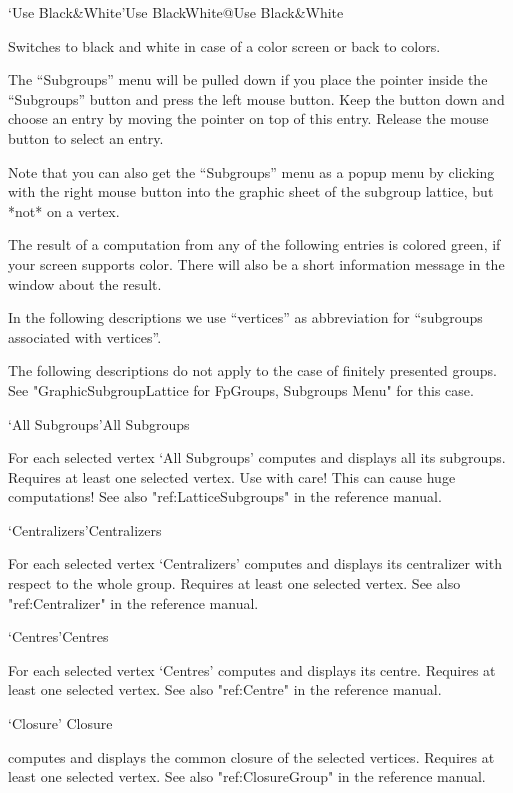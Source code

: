 \>`Use Black\&White'{Use BlackWhite}@{Use Black\&White}

Switches to black and white in case of a color screen or back to colors.



The ``Subgroups'' menu will be pulled down  if you place the pointer inside
the ``Subgroups'' button and press the left mouse  button.  Keep the button
down and choose an entry   by moving the pointer  on  top of this  entry.
Release the mouse button to select an entry.

Note that you can also get the ``Subgroups'' menu as a popup menu by
clicking with the right mouse button into the graphic sheet of the subgroup
lattice, but *not* on a vertex.

The result   of a computation from   any of the  following  entries is
colored green, if your screen supports color.  There will also be a short
information message in the {\GAP} window about the result.

In the following descriptions   we use ``vertices'' as abbreviation  for
``subgroups associated with vertices''.

The following descriptions do not apply to the case of finitely presented
groups. See "GraphicSubgroupLattice for FpGroups, Subgroups Menu" for this
case. 

\>`All Subgroups'{All Subgroups}

For each selected vertex `All Subgroups' computes and displays all its
subgroups. Requires at least one selected vertex. Use with care! This can
cause huge computations!  See also "ref:LatticeSubgroups" in the {\GAP}
reference manual.

\>`Centralizers'{Centralizers}

For each selected vertex `Centralizers' computes and displays its
centralizer with respect to the whole group.  Requires at least one
selected vertex.  See also "ref:Centralizer" in the {\GAP}
reference manual.

\>`Centres'{Centres}

For each selected vertex `Centres' computes and displays its centre.
Requires at least one selected vertex. See also "ref:Centre" in the {\GAP}
reference manual.

\>`Closure' {Closure}

computes and displays the common closure of the selected vertices.
Requires at least one selected vertex. See also "ref:ClosureGroup" in the
{\GAP} reference manual.

